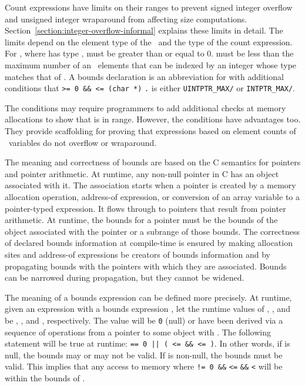 Count expressions have limits on their ranges to prevent signed integer
overflow and unsigned integer wraparound from affecting size
computations. Section~\ref{section:integer-overflow-informal}
explains these limits in detail. The limits
depend on the element type of the \arrayptr\ and the type of the count
expression. For , where 
has type \arrayptrT ,
 must be greater than or equal to 0.  must be less
than the maximum number of an
\arrayptrT\ elements
that can be indexed by an integer whose type matches that of .
A bounds declaration  is an
abbreviation for  with additional conditions that 
\texttt{>= 0 \&\&  <= (char *)}
\texttt{.}  is either
\texttt{UINTPTR\_MAX/} or
\texttt{INTPTR\_MAX/}. 

The conditions may require programmers to add additional checks at memory allocations
to show that  is in range. However, the conditions have advantages too.
They provide scaffolding for proving that expressions based on
element counts of \arrayptr\ variables do not overflow or wraparound.

The meaning and correctness of bounds are based on the C semantics for
pointers and pointer arithmetic. At runtime, any non-null pointer in C
has an object associated with it. The association starts when a pointer
is created by a memory allocation operation, address-of expression, or
conversion of an array variable to a pointer-typed expression. It flows
through to pointers that result from pointer arithmetic. At runtime, the
bounds for a pointer must be the bounds of the object associated with
the pointer or a subrange of those bounds. The correctness of declared
bounds information at compile-time is ensured by making allocation sites
and address-of expressions be creators of bounds information and by
propagating bounds with the pointers with which they are associated.
Bounds can be narrowed during propagation, but they cannot be widened.

The meaning of a bounds expression can be defined more precisely. At
runtime, given an expression  with a bounds expression
, let the runtime
values of , , and  be , ,
and , respectively. The value  will be \texttt{0} (null) or
have been derived via a sequence of operations from a pointer to some
object  with .
The following statement will be true at runtime:
 \texttt{== 0 || ( <= \&\& 
 <= )}. In other words, 
if  is null, the bounds
may or may not be valid. If  is non-null, the bounds must be
valid. This implies that any access to memory where  \texttt{!=
0 \&\&}  \texttt{<=}  \texttt{\&\&} 
\texttt{<}  will be within the bounds of .

